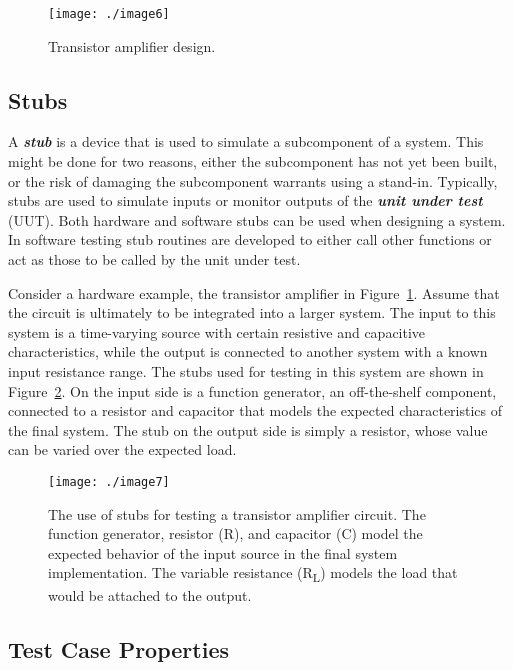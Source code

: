 \begin{figure}[h]
\centering
\texttt{[image: ./image6]}
\caption{Transistor amplifier design.}
\label{figure:transAmpDesign}
\end{figure}

\subsection{Stubs}
\label{subsection:stubs}

A \emph{\textbf{stub}} is a device that is used to simulate a
subcomponent of a system. This might be done for two reasons, either the
subcomponent has not yet been built, or the risk of damaging the
subcomponent warrants using a stand-in. Typically, stubs are used to
simulate inputs or monitor outputs of the \emph{\textbf{unit under
test}} (UUT). Both hardware and software stubs can be used when
designing a system. In software testing stub routines are developed to
either call other functions or act as those to be called by the unit
under test.

Consider a hardware example, the transistor amplifier in 
Figure~\ref{figure:transAmpDesign}.
Assume that the circuit is ultimately to be integrated into a larger
system. The input to this system is a time-varying source with certain
resistive and capacitive characteristics, while the output is connected
to another system with a known input resistance range. The stubs used
for testing in this system are shown in Figure~\ref{figure:usingStubs}. 
On the input side is
a function generator, an off-the-shelf component, connected to a
resistor and capacitor that models the expected characteristics of the
final system. The stub on the output side is simply a resistor, whose
value can be varied over the expected load.

\begin{figure}[h]
\centering
\texttt{[image: ./image7]}
\caption{The use of stubs for testing a transistor amplifier
circuit. The function generator, resistor (R), and capacitor (C) model
the expected behavior of the input source in the final system
implementation. The variable resistance (R\textsubscript{L}) models the
load that would be attached to the output.}
\label{figure:usingStubs}
\end{figure}


\subsection{Test Case Properties}
\label{subsection:test-case-properties}

